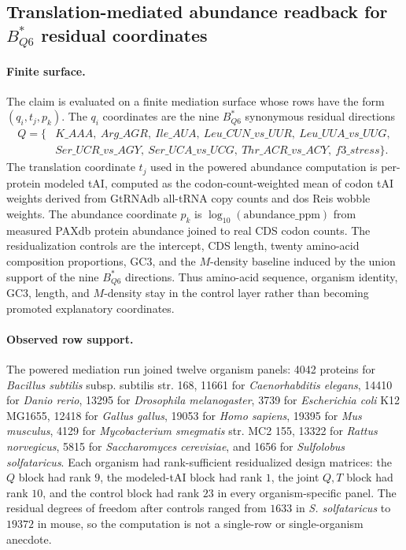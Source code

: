 \subsection{Translation-mediated abundance readback for $B^*_{Q6}$ residual coordinates}
\label{sec:q6-translation-mediated-protein-abundance-cross-layer}

\paragraph{Finite surface.}
The claim is evaluated on a finite mediation surface whose rows have the form $(q_i,t_j,p_k)$.  The $q_i$ coordinates are the nine $B^*_{Q6}$ synonymous residual directions
$$
\begin{aligned}
Q=\{&K\_AAA,\ Arg\_AGR,\ Ile\_AUA,\ Leu\_CUN\_vs\_UUR,\ Leu\_UUA\_vs\_UUG,\\
&Ser\_UCR\_vs\_AGY,\ Ser\_UCA\_vs\_UCG,\ Thr\_ACR\_vs\_ACY,\ f3\_stress\}.
\end{aligned}
$$
The translation coordinate $t_j$ used in the powered abundance computation is per-protein modeled tAI, computed as the codon-count-weighted mean of codon tAI weights derived from GtRNAdb all-tRNA copy counts and dos Reis wobble weights.  The abundance coordinate $p_k$ is $\log_{10}(\mathrm{abundance\_ppm})$ from measured PAXdb protein abundance joined to real CDS codon counts.  The residualization controls are the intercept, CDS length, twenty amino-acid composition proportions, GC3, and the $M$-density baseline induced by the union support of the nine $B^*_{Q6}$ directions.  Thus amino-acid sequence, organism identity, GC3, length, and $M$-density stay in the control layer rather than becoming promoted explanatory coordinates.

\paragraph{Observed row support.}
The powered mediation run joined twelve organism panels: 4042 proteins for \emph{Bacillus subtilis} subsp. subtilis str. 168, 11661 for \emph{Caenorhabditis elegans}, 14410 for \emph{Danio rerio}, 13295 for \emph{Drosophila melanogaster}, 3739 for \emph{Escherichia coli} K12 MG1655, 12418 for \emph{Gallus gallus}, 19053 for \emph{Homo sapiens}, 19395 for \emph{Mus musculus}, 4129 for \emph{Mycobacterium smegmatis} str. MC2 155, 13322 for \emph{Rattus norvegicus}, 5815 for \emph{Saccharomyces cerevisiae}, and 1656 for \emph{Sulfolobus solfataricus}.  Each organism had rank-sufficient residualized design matrices: the $Q$ block had rank $9$, the modeled-tAI block had rank $1$, the joint $Q,T$ block had rank $10$, and the control block had rank $23$ in every organism-specific panel.  The residual degrees of freedom after controls ranged from $1633$ in \emph{S. solfataricus} to $19372$ in mouse, so the computation is not a single-row or single-organism anecdote.

